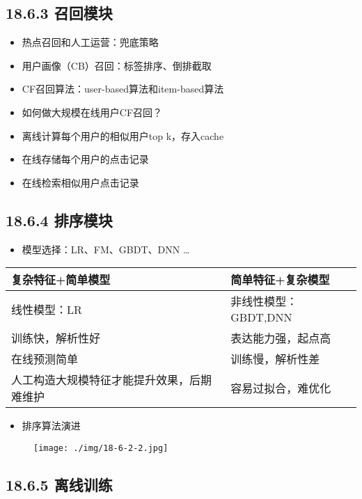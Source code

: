 \subsection{18.6.3 召回模块}\label{ux53ecux56deux6a21ux5757}

\begin{itemize}
\item
  热点召回和人工运营：兜底策略
\item
  用户画像（CB）召回：标签排序、倒排截取
\item
  CF召回算法：user-based算法和item-based算法
\item
  如何做大规模在线用户CF召回？
\item
  离线计算每个用户的相似用户top k，存入cache
\item
  在线存储每个用户的点击记录
\item
  在线检索相似用户点击记录
\end{itemize}

\subsection{18.6.4 排序模块}\label{ux6392ux5e8fux6a21ux5757}

\begin{itemize}
\item
  模型选择：LR、FM、GBDT、DNN \ldots{}
\end{itemize}

\begin{longtable}[]{ ll }
\toprule
复杂特征+简单模型 & 简单特征+复杂模型\tabularnewline
\midrule
\endhead
线性模型：LR & 非线性模型：GBDT,DNN\tabularnewline
训练快，解析性好 & 表达能力强，起点高\tabularnewline
在线预测简单 & 训练慢，解析性差\tabularnewline
人工构造大规模特征才能提升效果，后期难维护 &
容易过拟合，难优化\tabularnewline
\bottomrule
\end{longtable}

\begin{itemize}
\item
  排序算法演进
\end{itemize}

\begin{figure}
\centering
\texttt{[image: ./img/18-6-2-2.jpg]}
\caption{}
\end{figure}

\subsection{18.6.5 离线训练}\label{ux79bbux7ebfux8badux7ec3}

